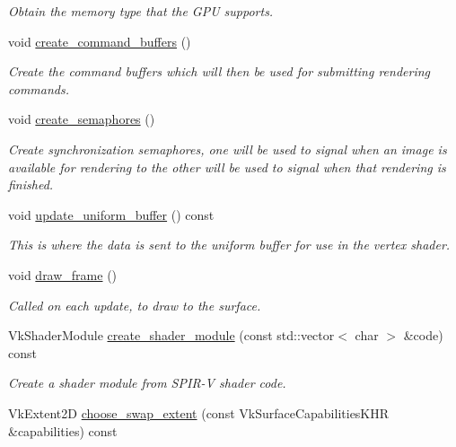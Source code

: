 \begin{DoxyCompactItemize}
\begin{DoxyCompactList}\small\item\em Obtain the memory type that the G\+PU supports. \end{DoxyCompactList}\item 
void \mbox{\hyperlink{classvulkan__application_a2ec6eaab6fd5b8eaa95029eaad6537fe}{create\+\_\+command\+\_\+buffers}} ()
\begin{DoxyCompactList}\small\item\em Create the command buffers which will then be used for submitting rendering commands. \end{DoxyCompactList}\item 
void \mbox{\hyperlink{classvulkan__application_a4060a7a236db93b53da6a51efd765f10}{create\+\_\+semaphores}} ()
\begin{DoxyCompactList}\small\item\em Create synchronization semaphores, one will be used to signal when an image is available for rendering to the other will be used to signal when that rendering is finished. \end{DoxyCompactList}\item 
void \mbox{\hyperlink{classvulkan__application_a6b685b0b52f3afd01b77f71325aa2ccb}{update\+\_\+uniform\+\_\+buffer}} () const
\begin{DoxyCompactList}\small\item\em This is where the data is sent to the uniform buffer for use in the vertex shader. \end{DoxyCompactList}\item 
void \mbox{\hyperlink{classvulkan__application_af2de4fec2329e96e5e0f020e6b4c3e02}{draw\+\_\+frame}} ()
\begin{DoxyCompactList}\small\item\em Called on each update, to draw to the surface. \end{DoxyCompactList}\item 
Vk\+Shader\+Module \mbox{\hyperlink{classvulkan__application_a20f3d58b5e0f58f4c8b3cf774da9f4da}{create\+\_\+shader\+\_\+module}} (const std\+::vector$<$ char $>$ \&code) const
\begin{DoxyCompactList}\small\item\em Create a shader module from S\+P\+I\+R-\/V shader code. \end{DoxyCompactList}\item 
Vk\+Extent2D \mbox{\hyperlink{classvulkan__application_a321b970cf84e0539418956dc32b2fe9d}{choose\+\_\+swap\+\_\+extent}} (const Vk\+Surface\+Capabilities\+K\+HR \&capabilities) const

\end{DoxyCompactItemize}
